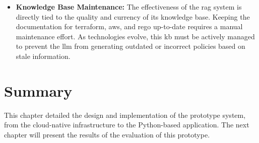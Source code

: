 \begin{itemize}
    \item \textbf{Knowledge Base Maintenance:} The effectiveness of the \gls{rag} system is directly tied to the quality and currency of its knowledge base. Keeping the documentation for \gls{terraform}, \gls{aws}, and \gls{rego} up-to-date requires a manual maintenance effort. As technologies evolve, this \gls{kb} must be actively managed to prevent the \gls{llm} from generating outdated or incorrect policies based on stale information.
\end{itemize}

\section{Summary}

This chapter detailed the design and implementation of the prototype system, from the cloud-native infrastructure to the Python-based application. The next chapter will present the results of the evaluation of this prototype.